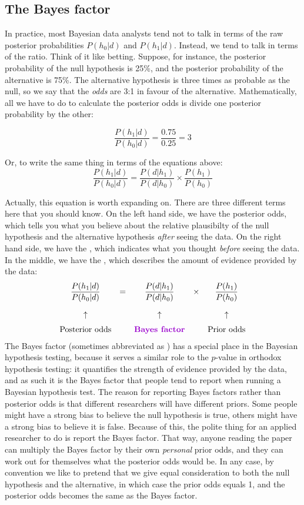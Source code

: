 \subsection{The Bayes factor}

In practice, most Bayesian data analysts tend not to talk in terms of the raw posterior probabilities $P(h_0|d)$ and $P(h_1|d)$. Instead, we tend to talk in terms of the  ratio. Think of it like betting. Suppose, for instance, the posterior probability of the null hypothesis is 25\%, and the posterior probability of the alternative is 75\%. The alternative hypothesis is three times as probable as the null, so we say that the {\it odds} are 3:1 in favour of the alternative. Mathematically, all we have to do to calculate the posterior odds is divide one posterior probability by the other:

$$
\frac{P(h_1 | d)}{P(h_0 | d)} = \frac{0.75}{0.25} = 3
$$

\noindent
Or, to write the same thing in terms of the equations above:
$$
\frac{P(h_1 | d)}{P(h_0 | d)} = \frac{P(d|h_1)}{P(d|h_0)} \times \frac{P(h_1)}{P(h_0)}
$$

Actually, this equation is worth expanding on. There are three different terms here that you should know. On the left hand side, we have the posterior odds, which tells you what you believe about the relative plausibilty of the null hypothesis and the alternative hypothesis {\it after} seeing the data. On the right hand side, we have the , which indicates what you thought {\it before} seeing the data. In the middle, we have the , which describes the amount of evidence provided by the data:
$$
\begin{array}{ccccc}\displaystyle
\frac{P(h_1 | d)}{P(h_0 | d)} &=& \displaystyle\frac{P(d|h_1)}{P(d|h_0)} &\times& \displaystyle\frac{P(h_1)}{P(h_0)} \\[6pt] \\[-2pt]
\uparrow && \uparrow && \uparrow \\[6pt]
\mbox{Posterior odds} && \mbox{\keyterm{Bayes factor}} && \mbox{Prior odds}
\end{array}
$$
The Bayes factor (sometimes abbreviated as ) has a special place in the Bayesian hypothesis testing, because it serves a similar role to the $p$-value in orthodox hypothesis testing: it quantifies the strength of evidence provided by the data, and as such it is the Bayes factor that people tend to report when running a Bayesian hypothesis test. The reason for reporting Bayes factors rather than posterior odds is that different researchers will have different priors. Some people might have a strong bias to believe the null hypothesis is true, others might have a strong bias to believe it is false. Because of this, the polite thing for an applied researcher to do is report the Bayes factor. That way, anyone reading the paper can multiply the Bayes factor by their own {\it personal} prior odds, and they can work out for themselves what the posterior odds would be. In any case, by convention we like to pretend that we give equal consideration to both the null hypothesis and the alternative, in which case the prior odds equals 1, and the posterior odds becomes the same as the Bayes factor.

